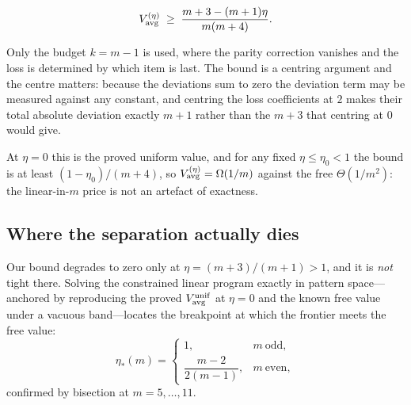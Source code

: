 \begin{theorem}
\label{thm:relaxed}
\begin{equation}
V^{(\eta)}_{\rm avg}\;\ge\;\frac{m+3-(m+1)\eta}{m(m+4)} .
\label{eq:relaxedbound}
\end{equation}
\end{theorem}


Only the budget $k=m-1$ is used, where the parity correction vanishes and the loss is
determined by which item is last. The bound is a centring argument and the centre matters:
because the deviations sum to zero the deviation term may be measured against any constant,
and centring the loss coefficients at $2$ makes their total absolute deviation exactly
$m+1$ rather than the $m+3$ that centring at $0$ would give.

At $\eta=0$ this is the proved uniform value, and for any fixed $\eta\le\eta_{0}<1$ the
bound is at least $(1-\eta_{0})/(m+4)$, so $V^{(\eta)}_{\rm avg}=\Omega(1/m)$ against the
free $\Theta(1/m^{2})$: the linear-in-$m$ price is not an artefact of exactness.


\subsection{Where the separation actually dies}

Our bound degrades to zero only at $\eta=(m+3)/(m+1)>1$, and it is \emph{not} tight there.
Solving the constrained linear program exactly in pattern space---anchored by reproducing
the proved $V^{\rm unif}_{\rm avg}$ at $\eta=0$ and the known free value under a vacuous
band---locates the breakpoint at which the frontier meets the free value:
\begin{equation}
\eta_{*}(m)=
\begin{cases}
1, & m\ \text{odd},\\[2pt]
\dfrac{m-2}{2(m-1)}, & m\ \text{even},
\end{cases}
\label{eq:breakpoint}
\end{equation}
confirmed by bisection at $m=5,\dots,11$. \CERT{}


